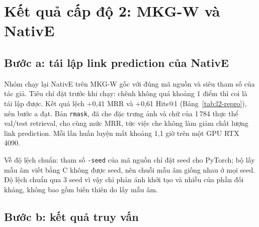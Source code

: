 \section{Kết quả cấp độ 2: MKG-W và NativE}
\label{sec:l2}

\subsection{Bước a: tái lập link prediction của NativE}

\begin{table}[t]
\centering
\caption{Link prediction trên tập test KGC của MKG-W (filtered). Bài báo chỉ công bố MRR và Hits@1 cho MKG-W. Dòng rmask:
3 seed.}
\label{tab:l2-repro}
\footnotesize
\setlength{\tabcolsep}{3pt}
\end{table}

Nhóm chạy lại NativE trên MKG-W gốc với đúng mã nguồn và siêu tham số của tác giả. Tiêu chí đặt trước khi chạy: chênh không
quá khoảng 1 điểm thì coi là tái lập được. Kết quả lệch +0,41 MRR và +0,61 Hits@1 (Bảng~\ref{tab:l2-repro}), nên bước a đạt.
Bản \texttt{rmask}, đã che đặc trưng ảnh và chữ của 1\,784 thực thể val/test retrieval, cho cùng mức MRR, tức việc che
không làm giảm chất lượng link prediction. Mỗi lần huấn luyện mất khoảng 1,1 giờ trên một GPU RTX 4090.

Về độ lệch chuẩn: tham số \texttt{-seed} của mã nguồn chỉ đặt seed cho PyTorch; bộ lấy mẫu âm viết bằng C không được seed,
nên chuỗi mẫu âm giống nhau ở mọi seed. Độ lệch chuẩn qua 3 seed vì vậy chỉ phản ánh khởi tạo và nhiễu của phần đối kháng,
không bao gồm biến thiên do lấy mẫu âm.

\subsection{Bước b: kết quả truy vấn}

